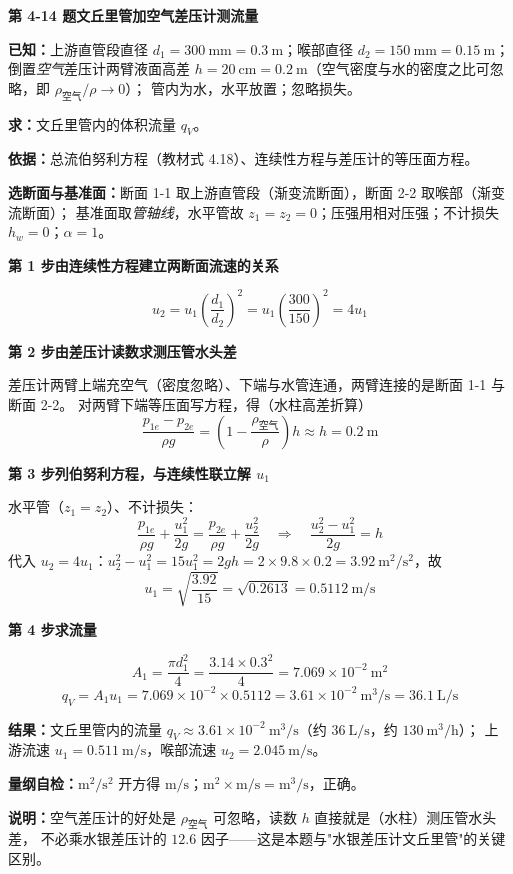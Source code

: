 \noindent\textbf{第 4-14 题\quad 文丘里管加空气差压计测流量}

\begin{jie}
\textbf{已知：}上游直管段直径 $d_1=300\ \mathrm{mm}=0.3\ \mathrm{m}$；喉部直径 $d_2=150\ \mathrm{mm}=0.15\ \mathrm{m}$；
倒置\emph{空气}差压计两臂液面高差 $h=20\ \mathrm{cm}=0.2\ \mathrm{m}$（空气密度与水的密度之比可忽略，即 $\rho_{\text{空气}}/\rho\to0$）；
管内为水，水平放置；忽略损失。

\textbf{求：}文丘里管内的体积流量 $q_V$。

\textbf{依据：}总流伯努利方程（教材式 4.18）、连续性方程与差压计的等压面方程。

\textbf{选断面与基准面：}断面 1-1 取上游直管段（渐变流断面），断面 2-2 取喉部（渐变流断面）；
基准面取\emph{管轴线}，水平管故 $z_1=z_2=0$；压强用相对压强；不计损失 $h_w=0$；$\alpha=1$。

\textbf{第 1 步\quad 由连续性方程建立两断面流速的关系}

\[ u_2=u_1\left(\frac{d_1}{d_2}\right)^2=u_1\left(\frac{300}{150}\right)^2=4u_1 \]

\textbf{第 2 步\quad 由差压计读数求测压管水头差}

差压计两臂上端充空气（密度忽略）、下端与水管连通，两臂连接的是断面 1-1 与断面 2-2。
对两臂下端等压面写方程，得（水柱高差折算）
\[ \frac{p_{1e}-p_{2e}}{\rho g}=\left(1-\frac{\rho_{\text{空气}}}{\rho}\right)h\approx h=0.2\ \mathrm{m} \]

\textbf{第 3 步\quad 列伯努利方程，与连续性联立解 $u_1$}

水平管（$z_1=z_2$）、不计损失：
\[ \frac{p_{1e}}{\rho g}+\frac{u_1^2}{2g}=\frac{p_{2e}}{\rho g}+\frac{u_2^2}{2g}
   \quad\Longrightarrow\quad
   \frac{u_2^2-u_1^2}{2g}=h \]
代入 $u_2=4u_1$：$u_2^2-u_1^2=15u_1^2=2gh=2\times9.8\times0.2=3.92\ \mathrm{m^2/s^2}$，故
\[ u_1=\sqrt{\frac{3.92}{15}}=\sqrt{0.2613}=0.5112\ \mathrm{m/s} \]

\textbf{第 4 步\quad 求流量}

\[ A_1=\frac{\pi d_1^2}{4}=\frac{3.14\times0.3^2}{4}=7.069\times10^{-2}\ \mathrm{m^2} \]
\[ q_V=A_1u_1=7.069\times10^{-2}\times0.5112=3.61\times10^{-2}\ \mathrm{m^3/s}=36.1\ \mathrm{L/s} \]

\textbf{结果：}文丘里管内的流量 $q_V\approx3.61\times10^{-2}\ \mathrm{m^3/s}$（约 $36\ \mathrm{L/s}$，约 $130\ \mathrm{m^3/h}$）；
上游流速 $u_1=0.511\ \mathrm{m/s}$，喉部流速 $u_2=2.045\ \mathrm{m/s}$。

\textbf{量纲自检：}$\mathrm{m^2/s^2}$ 开方得 $\mathrm{m/s}$；$\mathrm{m^2\times m/s}=\mathrm{m^3/s}$，正确。

\textbf{说明：}空气差压计的好处是 $\rho_{\text{空气}}$ 可忽略，读数 $h$ 直接就是（水柱）测压管水头差，
不必乘水银差压计的 $12.6$ 因子——这是本题与"水银差压计文丘里管"的关键区别。
\end{jie}

